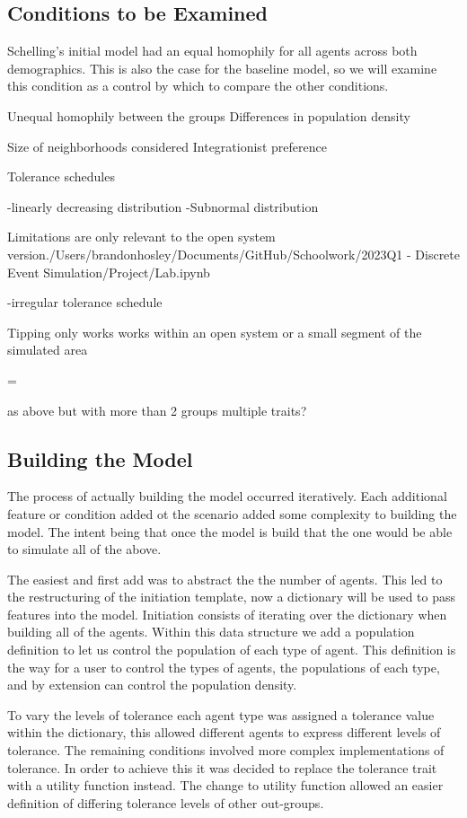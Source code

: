 \documentclass[sigplan,nonacm]{acmart}
\begin{document}
\subsection{Conditions to be Examined}

Schelling's initial model had an equal homophily for all agents across both demographics.
This is also the case for the baseline model, so we will examine this condition as a 
control by which to compare the other conditions.




Unequal homophily between the groups
Differences in population density

Size of neighborhoods considered
Integrationist preference


Tolerance schedules

-linearly decreasing distribution
-Subnormal distribution


Limitations are only relevant to the open system version./Users/brandonhosley/Documents/GitHub/Schoolwork/2023Q1 - Discrete Event Simulation/Project/Lab.ipynb

-irregular tolerance schedule

Tipping only works works within an open system or a small segment of the simulated area

=

as above but with more than 2 groups
multiple traits?

\subsection{Building the Model}

The process of actually building the model occurred iteratively.
Each additional feature or condition added ot the scenario added some complexity to building the model.
The intent being that once the model is build that the one would be able to simulate all of the above.

The easiest and first add was to abstract the the number of agents.
This led to the restructuring of the initiation template, now a dictionary will be used to pass
features into the model.
Initiation consists of iterating over the dictionary when building all of the agents.
Within this data structure we add a population definition to let us control the population of each type of agent.
This definition is the way for a user to control the types of agents, the populations of each type, 
and by extension can control the population density.

To vary the levels of tolerance each agent type was assigned a tolerance value within the dictionary,
this allowed different agents to express different levels of tolerance.
The remaining conditions involved more complex implementations of tolerance.
In order to achieve this it was decided to replace the tolerance trait with a utility function instead.
The change to utility function allowed an easier definition of differing tolerance levels of other out-groups.
\end{document}
